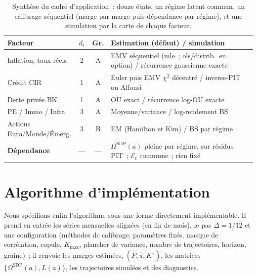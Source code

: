 \documentclass[11pt,a4paper]{article}
\theoremstyle{definition}
\newcommand{\Ecal}{\mathcal{E}}
\newcommand{\Dt}{\Delta}
\begin{document}
\begin{table}[H]
\centering\small\renewcommand{\arraystretch}{1.3}\setlength{\tabcolsep}{5pt}
\begin{tabularx}{\textwidth}{@{}l c c X@{}}
\toprule
\textbf{Facteur} & \textbf{$d_i$} & \textbf{Gr.} & \textbf{Estimation (défaut) / simulation}\\
\midrule
\rowcolor{nxlightblue} Inflation, taux réels & 2 & A & EMV séquentiel (mle~; ols/distrib.\ en option) / récurrence gaussienne exacte\\
Crédit CIR & 1 & A & Euler puis EMV $\chi^2$ décentré / inverse-PIT ou Alfonsi\\
\rowcolor{nxlightblue} Dette privée BK & 1 & A & OU exact / récurrence log-OU exacte\\
PE / Immo / Infra & 3 & A & Moyenne/variance / log-rendement BS\\
Actions Euro/Monde/Émerg. & 3 & B & EM (Hamilton et Kim) / BS par régime\\
\midrule
\rowcolor{nxoffwhite} \textbf{Dépendance} & --- & --- & $\Omega^{\mathrm{SDP}}(a)$ pleine par régime, sur résidus PIT~; $\Ecal_t$ commune~; rien fixé\\
\bottomrule
\end{tabularx}
\caption{Synthèse du cadre d'application~: douze états, un régime latent commun, un calibrage séquentiel (marge par marge puis dépendance par régime), et une simulation par la carte de chaque facteur.}
\label{tab:appli}
\end{table}

\section{Algorithme d'implémentation}
\label{sec:algo}
Nous spécifions enfin l'algorithme sous une forme directement implémentable. Il prend en entrée les séries mensuelles alignées (en fin de mois), le pas $\Dt=1/12$ et une configuration (méthodes de calibrage, paramètres fixés, masque de corrélation, copule, $K_{\max}$, plancher de variance, nombre de trajectoires, horizon, graine)~; il renvoie les marges estimées, $(\hat P,\hat\pi,K^\star)$, les matrices $\{\Omega^{\mathrm{SDP}}(a),L(a)\}$, les trajectoires simulées et des diagnostics.
\end{document}
